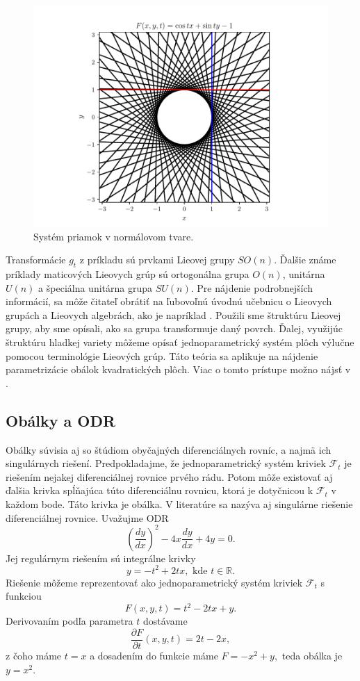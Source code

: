\begin{example}
\begin{figure}[H]
	\centering
	\includegraphics{images/lines_in_normal_form.pdf}
	\caption{Systém priamok v normálovom tvare.}
	\label{fig:lines_in_normal_form}
\end{figure}

\end{example}

Transformácie $g_{t}$ z príkladu sú prvkami Lieovej grupy $SO(n)$. Ďalšie známe príklady maticových Lieovych grúp sú ortogonálna grupa $O(n)$, unitárna $U(n)$ a špeciálna unitárna grupa $SU(n).$ 
Pre nájdenie podrobnejších informácií, sa môže čitateľ obrátiť na ľubovoľnú úvodnú učebnicu o Lieovych grupách a Lieovych algebrách, ako je napríklad \cite{Lee12}.
Použili sme štruktúru Lieovej grupy, aby sme opísali, ako sa grupa transformuje daný povrch. Ďalej, využijúc štruktúru hladkej variety môžeme opísať jednoparametrický systém plôch výlučne pomocou terminológie Lieových grúp. Táto teória sa aplikuje na nájdenie parametrizácie obálok kvadratických plôch. Viac o tomto prístupe možno nájsť v \cite{Vra22}. 

\subsection{Obálky a ODR}
Obálky súvisia aj so štúdiom obyčajných diferenciálnych rovníc, a najmä ich singulárnych riešení. Predpokladajme, že jednoparametrický systém kriviek $\mathcal{F}_t$ je riešením nejakej diferenciálnej rovnice prvého rádu. Potom môže existovať aj ďalšia krivka spĺňajúca túto diferenciálnu rovnicu, ktorá je dotyčnicou k $\mathcal{F}_t$ v každom bode. Táto krivka je obálka. V literatúre sa nazýva aj singulárne riešenie diferenciálnej rovnice.
Uvažujme ODR 
$$
\left(\frac{dy}{dx}\right)^2 - 4x\frac{dy}{dx} + 4y = 0.
$$
Jej regulárnym riešením sú integrálne krivky 
$$ y = - t^2 + 2tx, \text{ kde } t \in \mathbb{R}.$$
Riešenie môžeme reprezentovať ako jednoparametrický systém kriviek $\mathcal{F}_t$ s funkciou
$$F(x,y,t) = t^2 - 2tx + y. $$
Derivovaním podľa parametra $t$ dostávame
$$\dfrac{\partial F}{\partial t} (x,y,t) = 2t - 2x, $$
z čoho máme $t=x$ a dosadením do funkcie máme $F=-x^2+y,$ teda obálka je $y=x^2.$

